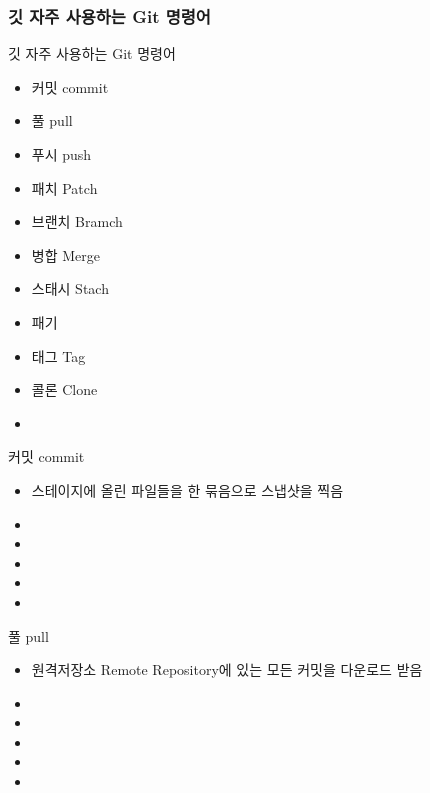 \documentclass[aspectratio=1610,20pt,xcolor=pdftex,dvipsnames,table,handout]{beamer}
\begin{document}
		\begin{frame} [t,plain]
		\frametitle{깃 자주 사용하는 Git 명령어}

			\begin{block} {깃 자주 사용하는 Git 명령어}
			\setlength{\leftmargini}{2em}			
			\begin{itemize}
				\item 커밋 	\hrulefill commit
				\item 풀	 	\hrulefill pull
				\item 푸시 	\hrulefill push
				\item 패치 	\hrulefill Patch
				\item 브랜치	\hrulefill Bramch
				\item 병합		\hrulefill Merge
				\item 스태시	\hrulefill Stach
				\item 패기		\hrulefill 
				\item 태그		\hrulefill Tag
				\item 콜론		\hrulefill Clone
				\item 
			\end{itemize}
			\end{block}						
		\end{frame}			


		\begin{frame} [t,plain]
			\begin{block} {커밋 	\hrulefill commit}
			\setlength{\leftmargini}{2em}			
			\begin{itemize}
				\item 스테이지에 올린 파일들을 한 묶음으로 스냅샷을 찍음
				\item 
				\item 
				\item 
				\item 
				\item 
			\end{itemize}
			\end{block}						
		\end{frame}			

		\begin{frame} [t,plain]
			\begin{block} {풀	 	\hrulefill pull}
			\setlength{\leftmargini}{2em}			
			\begin{itemize}
				\item 원격저장소 Remote Repository에 있는 모든 커밋을 다운로드 받음 
				\item 
				\item 
				\item 
				\item 
				\item 
			\end{itemize}
			\end{block}						
		\end{frame}			
\end{document}
